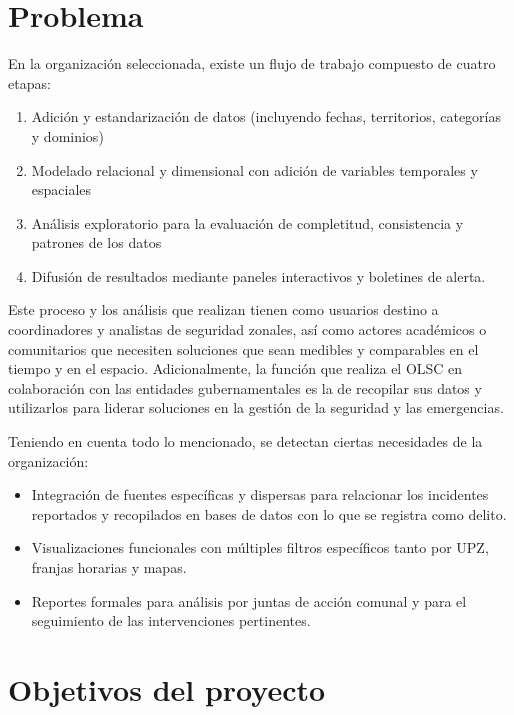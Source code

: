 \documentclass[12pt,letterpaper]{article}
\begin{document}
\section{Problema}

En la organización seleccionada, existe un flujo de trabajo compuesto de cuatro etapas:

\begin{enumerate}[label=\roman*.]
    \item Adición y estandarización de datos (incluyendo fechas, territorios, categorías y dominios)
    \item Modelado relacional y dimensional con adición de variables temporales y espaciales
    \item Análisis exploratorio para la evaluación de completitud, consistencia y patrones de los datos
    \item Difusión de resultados mediante paneles interactivos y boletines de alerta.
\end{enumerate}

Este proceso y los análisis que realizan tienen como usuarios destino a coordinadores y analistas de seguridad zonales, así como actores académicos o comunitarios que necesiten soluciones que sean medibles y comparables en el tiempo y en el espacio. Adicionalmente, la función que realiza el OLSC en colaboración con las entidades gubernamentales es la de recopilar sus datos y utilizarlos para liderar soluciones en la gestión de la seguridad y las emergencias.

Teniendo en cuenta todo lo mencionado, se detectan ciertas necesidades de la organización:

\begin{itemize}
    \item Integración de fuentes específicas y dispersas para relacionar los incidentes reportados y recopilados en bases de datos con lo que se registra como delito.
    \item Visualizaciones funcionales con múltiples filtros específicos tanto por UPZ, franjas horarias y mapas.
    \item Reportes formales para análisis por juntas de acción comunal y para el seguimiento de las intervenciones pertinentes.
\end{itemize}

\section{Objetivos del proyecto}
\end{document}
